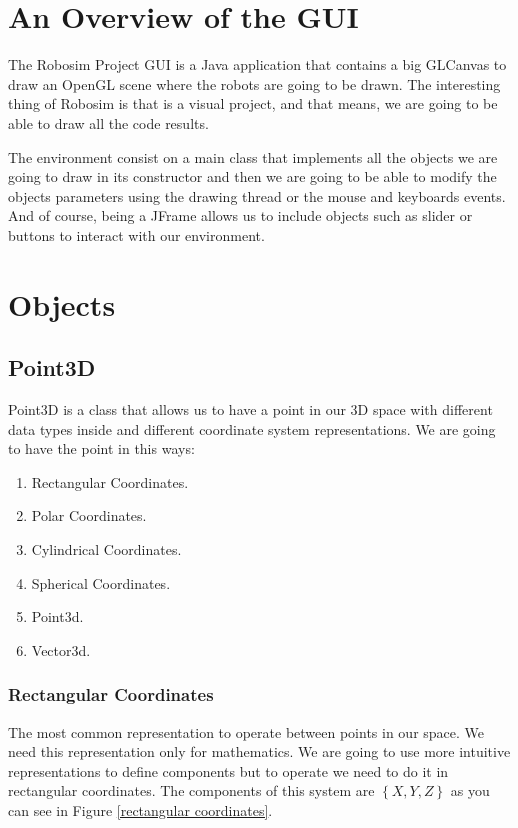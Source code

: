 \documentclass[12pt,a4paper,oneside,english]{book}
\begin{document}
\chapter{An Overview of the GUI}

The Robosim Project GUI is a Java application that contains a big GLCanvas to draw an OpenGL scene where the robots are going to be drawn. The interesting thing of Robosim is that is a visual project, and that means, we are going to be able to draw all the code results.

The environment consist on a main class that implements all the objects we are going to draw in its constructor and then we are going to be able to modify the objects parameters using the drawing thread or the mouse and keyboards events. And of course, being a JFrame allows us to include objects such as slider or buttons to interact with our environment.

\chapter{Objects}

\section{Point3D}

Point3D is a class that allows us to have a point in our 3D space with different data types inside and different coordinate system representations. We are going to have the point in this ways:

\begin{enumerate}
  \item Rectangular Coordinates.
  \item Polar Coordinates.
  \item Cylindrical Coordinates.
  \item Spherical Coordinates.
  \item Point3d.
  \item Vector3d.
\end{enumerate}

\newpage

\subsection{Rectangular Coordinates}

The most common representation to operate between points in our space. We need this representation only for mathematics. We are going to use more intuitive representations to define components but to operate we need to do it in rectangular coordinates. The components of this system are $\left\{X,Y,Z\right\}$  as you can see in Figure \ref{rectangular coordinates}.
\end{document}
